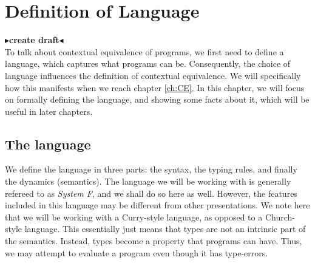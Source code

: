 \documentclass[twoside,11pt,openright]{report}
\theoremstyle{definition}
\newcommand{\todo}[1]{{\color[rgb]{.5,0,0}\textbf{$\blacktriangleright$#1$\blacktriangleleft$}}}
\begin{document}
\chapter{Definition of Language}
\label{ch:DoL}
\todo{create draft}\\
To talk about contextual equivalence of programs, we first need to define a language, which captures what programs can be. Consequently, the choice of language influences the definition of contextual equivalence. We will specifically how this manifests when we reach chapter \ref{ch:CE}. In this chapter, we will focus on formally defining the language, and showing some facts about it, which will be useful in later chapters.
\section{The language}
We define the language in three parts: the syntax, the typing rules, and finally the dynamics (semantics). The language we will be working with is generally refereed to as \textit{System F}, and we shall do so here as well. However, the features included in this language may be different from other presentations. We note here that we will be working with a Curry-style language, as opposed to a Church-style language. This essentially just means that types are not an intrinsic part of the semantics. Instead, types become a property that programs can have. Thus, we may attempt to evaluate a program even though it has type-errors.
\end{document}
